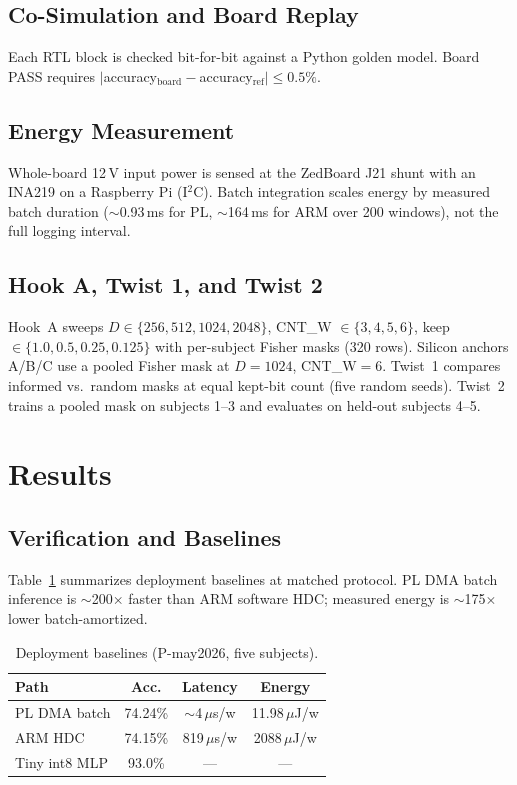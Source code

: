 \documentclass[conference]{IEEEtran}
\begin{document}
\subsection{Co-Simulation and Board Replay}
Each RTL block is checked bit-for-bit against a Python golden model.
Board PASS requires $|$accuracy$_{\mathrm{board}} - $accuracy$_{\mathrm{ref}}| \le 0.5\%$.

\subsection{Energy Measurement}
Whole-board 12\,V input power is sensed at the ZedBoard J21 shunt with an INA219 on
a Raspberry Pi (I$^2$C).
Batch integration scales energy by measured batch duration ($\sim$0.93\,ms for PL,
$\sim$164\,ms for ARM over 200 windows), not the full logging interval.

\subsection{Hook A, Twist 1, and Twist 2}
Hook~A sweeps $D \in \{256,512,1024,2048\}$, CNT\_W $\in \{3,4,5,6\}$, keep
$\in \{1.0,0.5,0.25,0.125\}$ with per-subject Fisher masks (320 rows).
Silicon anchors A/B/C use a pooled Fisher mask at $D{=}1024$, CNT\_W${=}6$.
Twist~1 compares informed vs.\ random masks at equal kept-bit count (five random seeds).
Twist~2 trains a pooled mask on subjects 1--3 and evaluates on held-out subjects 4--5.

\section{Results}
\label{sec:results}

\subsection{Verification and Baselines}
Table~\ref{tab:baselines} summarizes deployment baselines at matched protocol.
PL DMA batch inference is $\sim$200$\times$ faster than ARM software HDC; measured
energy is $\sim$175$\times$ lower batch-amortized.

\begin{table}[t]
\caption{Deployment baselines (P-may2026, five subjects).}
\label{tab:baselines}
\centering
\begin{tabular}{lccc}
\hline
\textbf{Path} & \textbf{Acc.} & \textbf{Latency} & \textbf{Energy} \\
\hline
PL DMA batch & 74.24\% & $\sim$4\,$\mu$s/w & 11.98\,$\mu$J/w \\
ARM HDC & 74.15\% & 819\,$\mu$s/w & 2088\,$\mu$J/w \\
Tiny int8 MLP & 93.0\% & --- & --- \\
\hline
\end{tabular}
\end{table}
\end{document}
